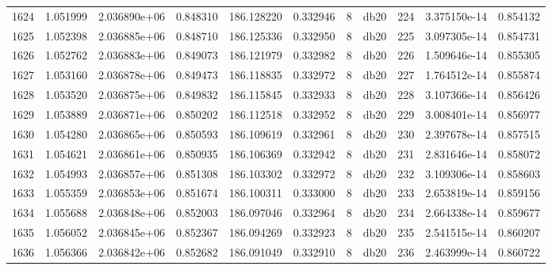 \begin{tabular}{lrrrrrrlrrr}
1624 &    1.051999 &        2.036890e+06 &  0.848310 &              186.128220 &    0.332946 &       8 &         db20 &    224 &   3.375150e-14 &      0.854132 \\
1625 &    1.052398 &        2.036885e+06 &  0.848710 &              186.125336 &    0.332950 &       8 &         db20 &    225 &   3.097305e-14 &      0.854731 \\
1626 &    1.052762 &        2.036883e+06 &  0.849073 &              186.121979 &    0.332982 &       8 &         db20 &    226 &   1.509646e-14 &      0.855305 \\
1627 &    1.053160 &        2.036878e+06 &  0.849473 &              186.118835 &    0.332972 &       8 &         db20 &    227 &   1.764512e-14 &      0.855874 \\
1628 &    1.053520 &        2.036875e+06 &  0.849832 &              186.115845 &    0.332933 &       8 &         db20 &    228 &   3.107366e-14 &      0.856426 \\
1629 &    1.053889 &        2.036871e+06 &  0.850202 &              186.112518 &    0.332952 &       8 &         db20 &    229 &   3.008401e-14 &      0.856977 \\
1630 &    1.054280 &        2.036865e+06 &  0.850593 &              186.109619 &    0.332961 &       8 &         db20 &    230 &   2.397678e-14 &      0.857515 \\
1631 &    1.054621 &        2.036861e+06 &  0.850935 &              186.106369 &    0.332942 &       8 &         db20 &    231 &   2.831646e-14 &      0.858072 \\
1632 &    1.054993 &        2.036857e+06 &  0.851308 &              186.103302 &    0.332972 &       8 &         db20 &    232 &   3.109306e-14 &      0.858603 \\
1633 &    1.055359 &        2.036853e+06 &  0.851674 &              186.100311 &    0.333000 &       8 &         db20 &    233 &   2.653819e-14 &      0.859156 \\
1634 &    1.055688 &        2.036848e+06 &  0.852003 &              186.097046 &    0.332964 &       8 &         db20 &    234 &   2.664338e-14 &      0.859677 \\
1635 &    1.056052 &        2.036845e+06 &  0.852367 &              186.094269 &    0.332923 &       8 &         db20 &    235 &   2.541515e-14 &      0.860207 \\
1636 &    1.056366 &        2.036842e+06 &  0.852682 &              186.091049 &    0.332910 &       8 &         db20 &    236 &   2.463999e-14 &      0.860722 \\

\end{tabular}
